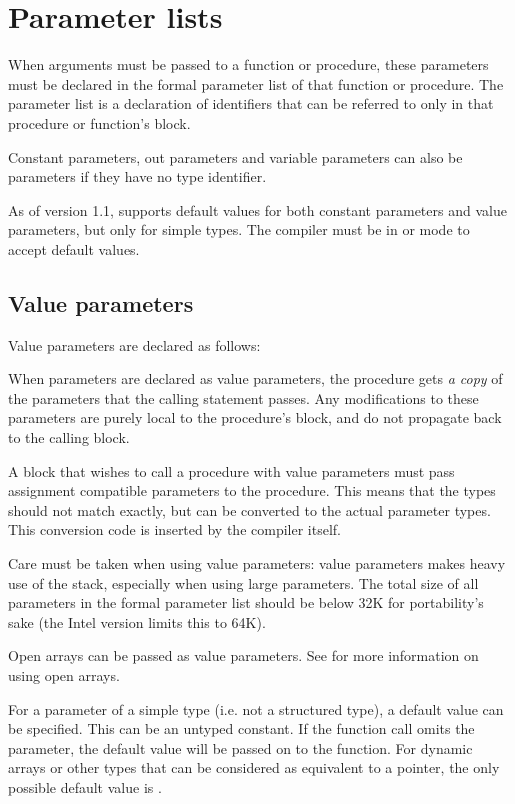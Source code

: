 \section{Parameter lists}
\label{se:Parameters}
When arguments must be passed to a function or procedure, these parameters
must be declared in the formal parameter list of that function or procedure.
The parameter list is a declaration of identifiers that can be referred to
only in that procedure or function's block.

Constant parameters, out parameters and variable parameters can also be 
parameters if they have no type
identifier.

As of version 1.1, \fpc supports default values for both constant parameters
and value parameters, but only for simple types. The compiler must be in
 or  mode to accept default values. 

\subsection{Value parameters}
Value parameters are declared as follows:

When parameters are declared as value parameters, the procedure gets {\em
a copy} of the parameters that the calling statement passes. Any modifications
to these parameters are purely local to the procedure's block, and do not
propagate back to the calling block.

A block that wishes to call a procedure with value parameters must pass
assignment compatible parameters to the procedure. 
This means that the types
should not match exactly, but can be converted to the actual parameter
types. This conversion code is inserted by the compiler itself.

Care must be taken when using value parameters: value parameters makes heavy
use of the stack, especially when using large parameters. The total size of
all parameters in the formal parameter list should be below 32K for
portability's sake (the Intel version limits this to 64K).

Open arrays can be passed as value parameters. See  for
more information on using open arrays.

For a parameter of a  simple type (i.e. not a structured type), a default
value can be specified. This can be an untyped constant. If the function
call omits the parameter, the default value will be passed on to the
function. For dynamic arrays or other types that can be considered as
equivalent to a pointer, the only possible default value is .

